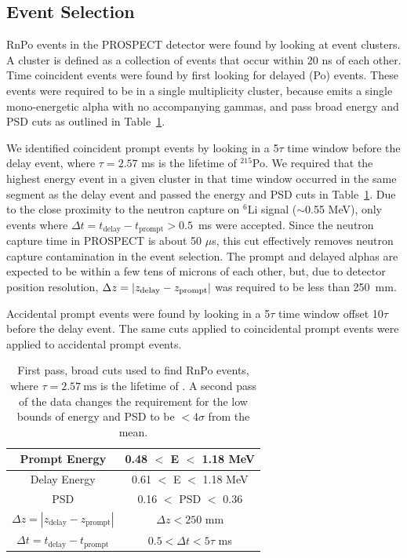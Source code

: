 \subsection{Event Selection}

RnPo events in the PROSPECT detector were found by looking at event clusters.
A cluster is defined as a collection of events that occur within 20 ns of each other.
Time coincident events were found by first looking for delayed (Po) events. 
These events were required to be in a single multiplicity cluster, because \Po emits a single mono-energetic alpha with no accompanying gammas, and pass broad energy and PSD cuts as outlined in Table~\ref{tab:RnPoCuts}.

We identified coincident prompt events by looking in a 5$\tau$ time window before the delay event, where $\tau = 2.57$ ms is the lifetime of $^{215}$Po.
We required that the highest energy event in a given cluster in that time window occurred in the same segment as the delay event and passed the energy and PSD cuts in Table~\ref{tab:RnPoCuts}.
Due to the close proximity to the neutron capture on $^6$Li signal ($\sim$0.55 MeV), only events where $\Delta t = t_{\textrm{delay}}-t_{\textrm{prompt}} > 0.5$~ms were accepted.
Since the neutron capture time in PROSPECT is about 50 $\mu$s, this cut effectively removes neutron capture contamination in the event selection.
The prompt and delayed alphas are expected to be within a few tens of microns of each other, but, due to detector position resolution, $\Delta z = \abs{z_{\textrm{delay}} - z_{\textrm{prompt}}}$ was required to be less than 250~mm.

Accidental prompt events were found by looking in a 5$\tau$ time window offset 10$\tau$ before the delay event. 
The same cuts applied to coincidental prompt events were applied to accidental prompt events.

\begin{table}[!t]
	\centering
\begin{tabular}{c|c}
	\hline 
	Prompt Energy & 0.48 $<$ E $<$ 1.18 MeV \\ 
	\hline 
	Delay Energy & 0.61 $<$ E $<$ 1.18 MeV \\ 
	\hline 
	PSD & 0.16 $<$ PSD $<$ 0.36 \\ 
	\hline 
	$\Delta z = |z_{\textrm{delay}} - z_{\textrm{prompt}}|$ & $\Delta z < 250$ mm  \\ 
	\hline 
	$\Delta t = t_{\textrm{delay}} - t_{\textrm{prompt}}$ & $0.5 < \Delta t < 5\tau$ ms \\ 
	\hline 
\end{tabular} 
\caption{First pass, broad cuts used to find RnPo events, where $\tau = 2.57~\textrm{ms}$ is the lifetime of \Po. A second pass of the data changes the requirement for the low bounds of energy and PSD to be $< 4 \sigma$ from the mean.}
\label{tab:RnPoCuts}
\end{table}


